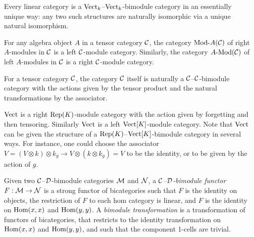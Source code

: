 \documentclass{amsart}
\begin{document}
\begin{example}
	Every linear category is a $\mathrm{Vect}_k$--$\mathrm{Vect}_k$-bimodule category in an essentially unique way: any two such structures are naturally isomorphic via a unique natural isomorphism.
\end{example}

\begin{example} \label{ex:ModulesAreModules}
	For any algebra object $A$ in a tensor category $\mathcal C$, the category $\Mod{}{A}(\cC)$ of right $A$-modules in $\mathcal C$ is a left $\mathcal C$-module category.  Similarly, the category $\Mod{A}{}(\cC)$ of left $A$-modules in $\mathcal C$ is a right $\mathcal C$-module category.
\end{example}

\begin{example}
For a tensor category $\mathcal C$, the category $\mathcal C$ itself is naturally a $\mathcal C$--$\mathcal C$-bimodule category with the actions given by the tensor product and the natural transformations by the associator.
\end{example}

\begin{example}
$\mathrm{Vect}$ is a right $\mathrm{Rep}(K)$-module category with the action given by forgetting and then tensoring.  Similarly $\mathrm{Vect}$ is a left $\mathrm{Vect}[K]$-module category.  Note that $\mathrm{Vect}$ can be given the structure of a $\mathrm{Rep}(K)$--$\mathrm{Vect}[K]$-bimodule category in several ways.  For instance, one could choose the associator $V = (V \otimes k) \otimes k_g \rightarrow V \otimes (k \otimes k_g) = V$ to be the identity, or to be given by the action of $g$.
\end{example}

\begin{definition}		
Given two $\mathcal C$--$\mathcal D$-bimodule categories $\mathcal M$ and $\mathcal N$, a {\em $\mathcal C$--$\mathcal D$-bimodule functor} $F:\mathcal M \to \mathcal N$ is a strong functor of bicategories such that 
		 $F$ is the identity on objects,
		  the restriction of $F$ to each hom category is linear,
		 and $F$ is the identity on $\operatorname{Hom}(x,x)$ and $\operatorname{Hom}(y,y)$.
	A {\em bimodule transformation} is a transformation of functors of bicategories, that restricts to the identity transformation on $\operatorname{Hom}(x,x)$ and $\operatorname{Hom}(y,y)$, and such that the component 1-cells are trivial.  
\end{definition} %
	
\end{document}
